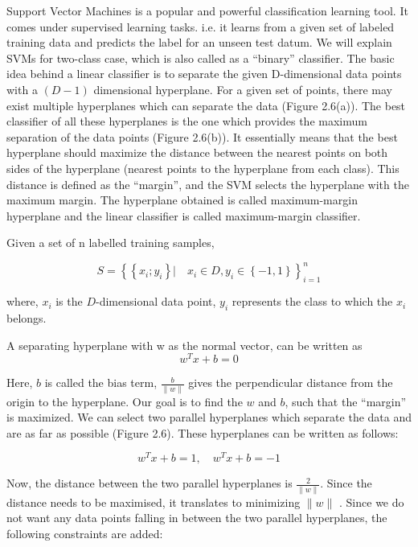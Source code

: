 Support Vector Machines is a popular and powerful classification learning tool. It comes under supervised learning tasks. i.e. it learns from a given set of labeled training data and predicts  the label for an unseen test datum. We will explain SVMs for two-class case, which is also called as a ``binary'' classifier. The basic idea behind a linear classifier is to separate the given D-dimensional data points with a $(D − 1)$ dimensional hyperplane. For a given set of points, there may exist multiple hyperplanes which can separate the data (Figure 2.6(a)). The best classifier of all these hyperplanes is the one which provides the maximum separation of the data points (Figure 2.6(b)). It essentially means that the best hyperplane should maximize the distance between the nearest points on both sides of the hyperplane (nearest points to the hyperplane from each class). This distance is defined as the ``margin'', and the SVM selects the hyperplane with the maximum margin. The hyperplane obtained is called maximum-margin hyperplane and the linear classifier is called maximum-margin classifier.

Given a set of n labelled training samples,

\begin{equation}
S =\left\lbrace \left\lbrace x_i ; y_i \right\rbrace | \quad x_i \in D , y_i \in \left\lbrace −1, 1 \right\rbrace \right\rbrace _{i=1}^n
\end{equation}

where, $x_i$ is the $D$-dimensional data point, $y_i$ represents the class to which the $x_i$ belongs.

A separating hyperplane with w as the normal vector, can be written as
\begin{equation}
{w^T}x + b = 0
\end{equation}

Here, $b$ is called the bias term, $\frac{b}{\|w\|}$ gives the perpendicular distance from the origin to the hyperplane. Our goal is to find the $w$ and $b$, such that the ``margin'' is maximized. We can select two parallel hyperplanes which separate the data and are as far as possible (Figure 2.6). These hyperplanes can be written as follows:

\begin{equation}
{w^T}x + b = 1 , \quad
{w^T}x + b = -1
\end{equation}

Now, the distance between the two parallel hyperplanes is $\frac{2}{\|w\|}$. Since the distance needs to be maximised, it translates to minimizing $\|w\|$ . Since we do not want any data points falling in between the two parallel hyperplanes, the following constraints are added:

